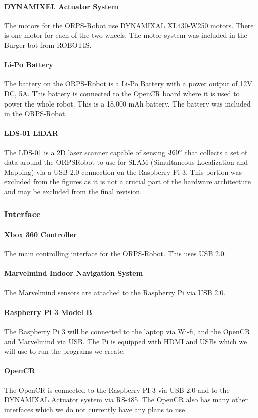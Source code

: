 \documentclass[english,12pt]{article}
\begin{document}
\paragraph{DYNAMIXEL Actuator System}
The motors for the ORPS-Robot use DYNAMIXAL XL430-W250 motors. There is one motor for each of
the two wheels. The motor system was included in the Burger bot from ROBOTIS.
\paragraph{Li-Po Battery}
The battery on the ORPS-Robot is a Li-Po Battery with a power output of 12V DC, 5A. This battery is
connected to the OpenCR board where it is used to power the whole robot. This is a 18,000 mAh
battery. The battery was included in the ORPS-Robot.
\paragraph{LDS-01 LiDAR}
The LDS-01 is a 2D laser scanner capable of sensing $360\degree$ that collects a set of data around the ORPSRobot
to use for SLAM (Simultaneous Localization and Mapping) via a USB 2.0 connection on the
Raspberry Pi 3. This portion was excluded from the figures as it is not a crucial part of the hardware
architecture and may be excluded from the final revision.
\subsubsection{Interface}
\paragraph{Xbox 360 Controller}
The main controlling interface for the ORPS-Robot. This uses USB 2.0.
\paragraph{Marvelmind Indoor Navigation System}
The Marvelmind sensors are attached to the Raspberry Pi via USB 2.0.
\paragraph{Raspberry Pi 3 Model B}
The Raspberry Pi 3 will be connected to the laptop via Wi-fi, and the OpenCR and Marvelmind via USB.
The Pi is equipped with HDMI and USBs which we will use to run the programs we create.
\paragraph{OpenCR}
The OpenCR is connected to the Raspberry PI 3 via USB 2.0 and to the DYNAMIXAL Actuator system via
RS-485. The OpenCR also has many other interfaces which we do not currently have any plans to use.
\end{document}
